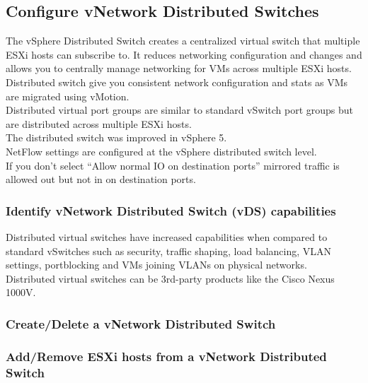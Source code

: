 \subsection{Configure vNetwork Distributed Switches}

The vSphere Distributed Switch creates a centralized virtual switch that
multiple ESXi hosts can subscribe to. It reduces networking configuration and
changes and allows you to centrally manage networking for VMs across multiple
ESXi hosts.\\

Distributed switch give you consistent network configuration and stats as
VMs are migrated using vMotion.\\

Distributed virtual port groups are similar to standard vSwitch port groups
but are distributed across multiple ESXi hosts.\\

The distributed switch was improved in vSphere 5.\\

NetFlow settings are configured at the vSphere distributed switch level.\\

If you don't select ``Allow normal IO on destination ports'' mirrored traffic
is allowed out but not in on destination ports.

\subsubsection{Identify vNetwork Distributed Switch (vDS) capabilities}

Distributed virtual switches have increased capabilities when compared to
standard vSwitches such as security, traffic shaping, load balancing, VLAN
settings, portblocking and VMs joining VLANs on physical networks.\\

Distributed virtual switches can be 3rd-party products like the Cisco Nexus
1000V.

\subsubsection{Create/Delete a vNetwork Distributed Switch}

\subsubsection{Add/Remove ESXi hosts from a vNetwork Distributed Switch}

